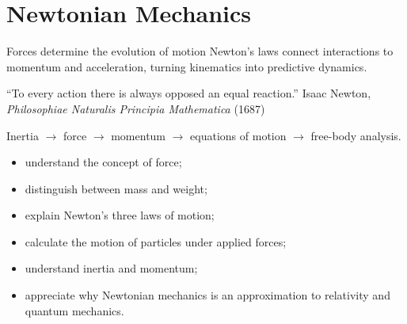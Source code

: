 \chapter{Newtonian Mechanics}
\chapteropeningart
{Forces determine the evolution of motion}
{Newton's laws connect interactions to momentum and acceleration, turning
kinematics into predictive dynamics.}

\chapterquote
{``To every action there is always opposed an equal reaction.''}
{Isaac Newton, \emph{Philosophiae Naturalis Principia Mathematica} (1687)}

\begin{roadmapbox}
Inertia $\longrightarrow$ force $\longrightarrow$ momentum
$\longrightarrow$ equations of motion $\longrightarrow$ free-body analysis.
\end{roadmapbox}


\learningobjectives

\begin{itemize}
	\item understand the concept of force;
	\item distinguish between mass and weight;
	\item explain Newton's three laws of motion;
	\item calculate the motion of particles under applied forces;
	\item understand inertia and momentum;
	\item appreciate why Newtonian mechanics is an approximation to relativity
	and quantum mechanics.
\end{itemize}


